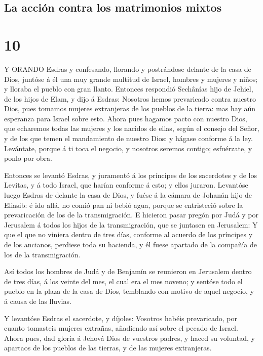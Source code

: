 \hypertarget{la-acciuxf3n-contra-los-matrimonios-mixtos}{%
\subsection{La acción contra los matrimonios
mixtos}\label{la-acciuxf3n-contra-los-matrimonios-mixtos}}

\hypertarget{section-9}{%
\section{10}\label{section-9}}

 Y ORANDO Esdras y confesando, llorando y postrándose
delante de la casa de Dios, juntóse á él una muy grande multitud de
Israel, hombres y mujeres y niños; y lloraba el pueblo con gran llanto.
 Entonces respondió Sechânías hijo de Jehiel, de los hijos
de Elam, y dijo á Esdras: Nosotros hemos prevaricado contra nuestro
Dios, pues tomamos mujeres extranjeras de los pueblos de la tierra: mas
hay aún esperanza para Israel sobre esto.  Ahora pues
hagamos pacto con nuestro Dios, que echaremos todas las mujeres y los
nacidos de ellas, según el consejo del Señor, y de los que temen el
mandamiento de nuestro Dios: y hágase conforme á la ley. 
Levántate, porque á ti toca el negocio, y nosotros seremos contigo;
esfuérzate, y ponlo por obra.

 Entonces se levantó Esdras, y juramentó á los príncipes de
los sacerdotes y de los Levitas, y á todo Israel, que harían conforme á
esto; y ellos juraron.  Levantóse luego Esdras de delante la
casa de Dios, y fuése á la cámara de Johanán hijo de Eliasib: é ido
allá, no comió pan ni bebió agua, porque se entristeció sobre la
prevaricación de los de la transmigración.  E hicieron pasar
pregón por Judá y por Jerusalem á todos los hijos de la transmigración,
que se juntasen en Jerusalem:  Y que el que no viniera
dentro de tres días, conforme al acuerdo de los príncipes y de los
ancianos, perdiese toda su hacienda, y él fuese apartado de la compañía
de los de la transmigración.

 Así todos los hombres de Judá y de Benjamín se reunieron en
Jerusalem dentro de tres días, á los veinte del mes, el cual era el mes
noveno; y sentóse todo el pueblo en la plaza de la casa de Dios,
temblando con motivo de aquel negocio, y á causa de las lluvias.

 Y levantóse Esdras el sacerdote, y díjoles: Vosotros
habéis prevaricado, por cuanto tomasteis mujeres extrañas, añadiendo así
sobre el pecado de Israel.  Ahora pues, dad gloria á Jehová
Dios de vuestros padres, y haced su voluntad, y apartaos de los pueblos
de las tierras, y de las mujeres extranjeras.

